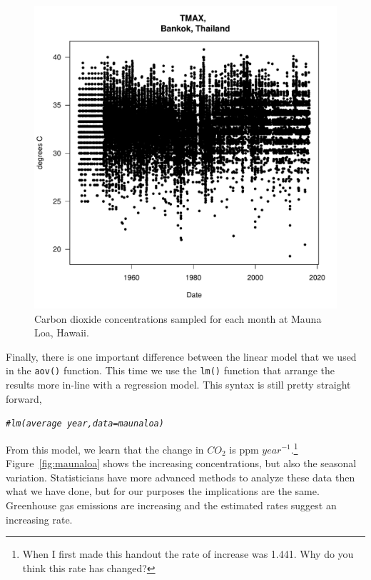 \documentclass{article}\usepackage[]{graphicx}\usepackage[]{color}
\makeatletter
\def\maxwidth{ %
  \ifdim\Gin@nat@width>\linewidth
    \linewidth
  \else
    \Gin@nat@width
  \fi
}
\newcommand{\hlcom}[1]{\textcolor[rgb]{0.678,0.584,0.686}{\textit{#1}}}%
\newenvironment{kframe}{%
 \def\at@end@of@kframe{}%
 \ifinner\ifhmode%
  \def\at@end@of@kframe{\end{minipage}}%
  \begin{minipage}{\columnwidth}%
 \fi\fi%
 \def\FrameCommand##1{\hskip\@totalleftmargin \hskip-\fboxsep
 \colorbox{shadecolor}{##1}\hskip-\fboxsep
     \hskip-\linewidth \hskip-\@totalleftmargin \hskip\columnwidth}%
 \MakeFramed {\advance\hsize-\width
   \@totalleftmargin\z@ \linewidth\hsize
   \@setminipage}}%
 {\par\unskip\endMakeFramed%
 \at@end@of@kframe}
\newenvironment{knitrout}{}{} %
\makeatother
\begin{document}
\begin{figure}
\label{fig:test12}
\caption{Carbon dioxide concentrations sampled for each month at Mauna Loa, Hawaii.}
\begin{knitrout}
\color{fgcolor}
\includegraphics[width=\maxwidth]{figure/unnamed-chunk-13-1} 

\end{knitrout}
\end{figure}


Finally, there is one important difference between the linear model that we used in the \texttt{aov()} function. This time we use the \texttt{lm()} function that arrange the results more in-line with a regression model.
This syntax is still pretty straight forward,  

\begin{knitrout}
\color{fgcolor}\begin{kframe}
\begin{alltt}
\hlcom{#lm(average ~ year, data=maunaloa)}
\end{alltt}
\end{kframe}
\end{knitrout}

From this model, we learn that the change in $CO_2$ is 
ppm $year^{-1}$.\footnote{When I first made this handout the rate of increase was 1.441. Why do you think this rate has changed?} Figure~\ref{fig:maunaloa} shows the increasing concentrations, but also the seasonal variation. Statisticians have more advanced methods to analyze these data then what we have done, but for our purposes the implications are the same.  Greenhouse gas emissions are increasing and the estimated rates suggest an increasing rate.
\end{document}
